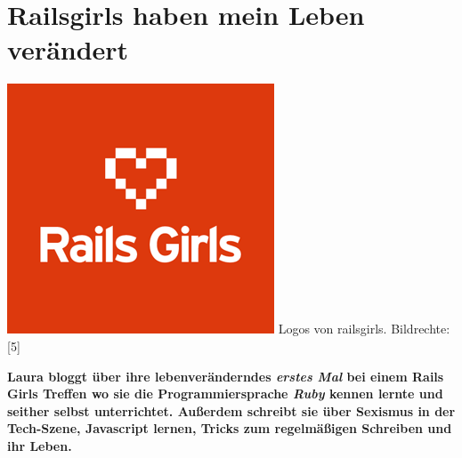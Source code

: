 \section*{Railsgirls haben mein Leben verändert}
\hypertarget{laura}{}
\label{laura}

\begin{center}
\includegraphics[width=\linewidth]{laura/laura-railsgirls.png}
\footnotesize{Logos von railsgirls. Bildrechte: [5]}
\end{center}

\textbf{Laura bloggt über ihre lebenveränderndes \textit{erstes Mal} bei einem Rails Girls Treffen wo sie die Programmiersprache \textit{Ruby} kennen lernte und seither selbst unterrichtet. Außerdem schreibt sie über Sexismus in der Tech-Szene, Javascript lernen, Tricks zum regelmäßigen Schreiben und ihr Leben.} \\

